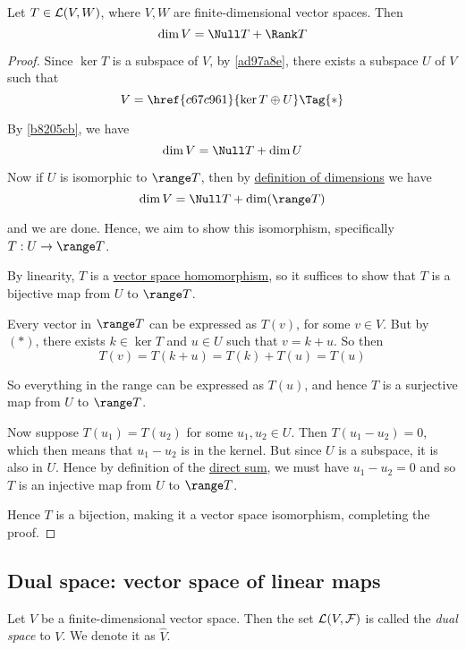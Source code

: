 \label{ee102e4}

Let $T\in\mathcal L(V,W)$, where $V,W$ are finite-dimensional vector spaces. Then
$$
  \dim V=\Null T+\Rank T
$$

\begin{proof}
  Since $\ker T$ is a subspace of $V$, by \autoref{ad97a8e}, there exists a
  subspace $U$ of $V$ such that
  \begin{equation*}
    V=\href{c67c961}{\ker T\oplus U}\Tag{*}
  \end{equation*}

  By \autoref{b8205cb}, we have
  $$
    \dim V=\Null T+\dim U
  $$

  Now if $U$ is isomorphic to $\range T$, then by \href{ad4a614}{definition of
  dimensions} we have
  $$
    \dim V=\Null T+\dim(\range T)
  $$

  and we are done. Hence, we aim to show this isomorphism, specifically
  $T:U\to\range T$.

  By linearity, $T$ is a \href{eacdfee}{vector space homomorphism}, so it
  suffices to show that $T$ is a bijective map from $U$ to $\range T$.

  Every vector in $\range T$ can be expressed as $T(v)$, for some $v\in V$. But
  by $(*)$, there exists $k\in\ker T$ and $u\in U$ such that $v=k+u$. So then
  $$
    T(v)=T(k+u)=T(k)+T(u)=T(u)
  $$

  So everything in the range can be expressed as $T(u)$, and hence $T$ is a
  surjective map from $U$ to $\range T$.

  Now suppose $T(u_1)=T(u_2)$ for some $u_1,u_2\in U$. Then $T(u_1-u_2)=0$,
  which then means that $u_1-u_2$ is in the kernel. But since $U$ is a
  subspace, it is also in $U$. Hence by definition of the \href{c67c961}{direct
  sum}, we must have $u_1-u_2=0$ and so $T$ is an injective map from $U$ to
  $\range T$.

  Hence $T$ is a bijection, making it a vector space isomorphism, completing
  the proof.
\end{proof}

\subsection{Dual space: vector space of linear maps}\label{a6723f8}

\label{cb9eede}

Let $V$ be a finite-dimensional vector space. Then the set
\href{ab1f2fb}{$\mathcal L(V,\mathcal F)$} is called the \textit{dual space} to $V$. We denote
it as $\hat V$.

